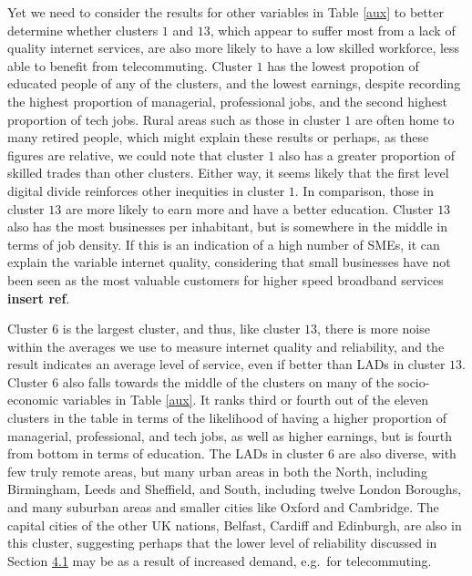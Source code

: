 \documentclass[Royal,times,sageh]{sagej}
\begin{document}
Yet we need to consider the results for other variables in Table
\ref{aux} to better determine whether clusters \(1\) and \(13\), which
appear to suffer most from a lack of quality internet services, are also
more likely to have a low skilled workforce, less able to benefit from
telecommuting. Cluster \(1\) has the lowest propotion of educated people
of any of the clusters, and the lowest earnings, despite recording the
highest proportion of managerial, professional jobs, and the second
highest proportion of tech jobs. Rural areas such as those in cluster
\(1\) are often home to many retired people, which might explain these
results or perhaps, as these figures are relative, we could note that
cluster \(1\) also has a greater proportion of skilled trades than other
clusters. Either way, it seems likely that the first level digital
divide reinforces other inequities in cluster \(1\). In comparison,
those in cluster \(13\) are more likely to earn more and have a better
education. Cluster \(13\) also has the most businesses per inhabitant,
but is somewhere in the middle in terms of job density. If this is an
indication of a high number of SMEs, it can explain the variable
internet quality, considering that small businesses have not been seen
as the most valuable customers for higher speed broadband services
\textbf{insert ref}.

Cluster \(6\) is the largest cluster, and thus, like cluster \(13\),
there is more noise within the averages we use to measure internet
quality and reliability, and the result indicates an average level of
service, even if better than LADs in cluster \(13\). Cluster \(6\) also
falls towards the middle of the clusters on many of the socio- economic
variables in Table \ref{aux}. It ranks third or fourth out of the eleven
clusters in the table in terms of the likelihood of having a higher
proportion of managerial, professional, and tech jobs, as well as higher
earnings, but is fourth from bottom in terms of education. The LADs in
cluster \(6\) are also diverse, with few truly remote areas, but many
urban areas in both the North, including Birmingham, Leeds and
Sheffield, and South, including twelve London Boroughs, and many
suburban areas and smaller cities like Oxford and Cambridge. The capital
cities of the other UK nations, Belfast, Cardiff and Edinburgh, are also
in this cluster, suggesting perhaps that the lower level of reliability
discussed in Section \protect\hyperlink{sec:4.1}{4.1} may be as a result
of increased demand, e.g.~for telecommuting.
\end{document}

